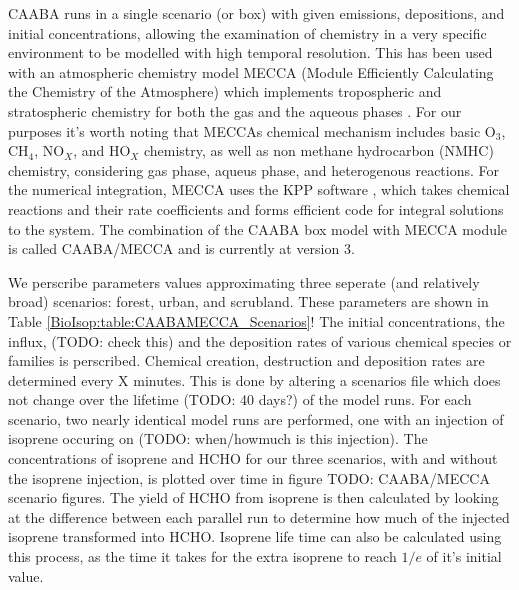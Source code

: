     CAABA runs in a single scenario (or box) with given emissions, depositions, and initial concentrations, allowing the examination of chemistry in a very specific environment to be modelled with high temporal resolution.
    This has been used with an atmospheric chemistry model MECCA (Module Efficiently Calculating the Chemistry of the Atmosphere) which implements tropospheric and stratospheric chemistry for both the gas and the aqueous phases \citep{Sander2005}.
    For our purposes it's worth noting that MECCAs chemical mechanism includes basic O$_3$, CH$_4$, NO$_X$, and HO$_X$ chemistry, as well as non methane hydrocarbon (NMHC) chemistry, considering gas phase, aqueus phase, and heterogenous reactions. \citep{Sander2005}
    For the numerical integration, MECCA uses the KPP software \citep{SanduSander2006}, which takes chemical reactions and their rate coefficients and forms efficient code for integral solutions to the system.
    The combination of the CAABA box model with MECCA module is called CAABA/MECCA and is currently at version 3.
    
    
    We perscribe parameters values approximating three seperate (and relatively broad) scenarios: forest, urban, and scrubland.
    These parameters are shown in Table \ref{BioIsop:table:CAABAMECCA_Scenarios}!
    The initial concentrations, the influx, (TODO: check this) and the deposition rates of various chemical species or families is perscribed.
    Chemical creation, destruction and deposition rates are determined every X minutes.
    This is done by altering a scenarios file which does not change over the lifetime (TODO: 40 days?) of the model runs.
    For each scenario, two nearly identical model runs are performed, one with an injection of isoprene occuring on (TODO: when/howmuch is this injection).
    The concentrations of isoprene and HCHO for our three scenarios, with and without the isoprene injection, is plotted over time in figure TODO: CAABA/MECCA scenario figures.
    The yield of HCHO from isoprene is then calculated by looking at the difference between each parallel run to determine how much of the injected isoprene transformed into HCHO.
    Isoprene life time can also be calculated using this process, as the time it takes for the extra isoprene to reach $1/e$ of it's initial value.
    
